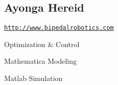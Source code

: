 \hypertarget{developers_ayonga}{}\subsection{Ayonga Hereid}\label{developers_ayonga}
\href{http://www.bipedalrobotics.com}{\tt http\+://www.\+bipedalrobotics.\+com}


\begin{DoxyItemize}
\item Optimization \& Control
\item Mathematica Modeling
\item Matlab Simulation 
\end{DoxyItemize}